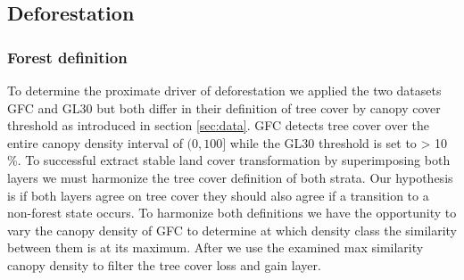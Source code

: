 	\subsection{Deforestation} 
		\subsubsection{Forest definition}
			To determine the proximate driver of deforestation we applied the two datasets \ac{GFC} and \ac{GL30} but both differ in their definition of tree cover by canopy cover threshold as introduced in section \ref{sec:data}. \ac{GFC} detects tree cover over the entire canopy density interval of $(0,100]$ while the \ac{GL30} threshold is set to > 10 \%. To successful extract stable land cover transformation by superimposing both layers we must harmonize the tree cover definition of both strata. Our hypothesis is if both layers agree on tree cover they should also agree if a transition to a non-forest state occurs. To harmonize both definitions we have the opportunity to vary the canopy density of \ac{GFC} to determine at which density class the similarity between them is at its maximum. After we use the examined max similarity canopy density to filter the tree cover loss and gain layer.

